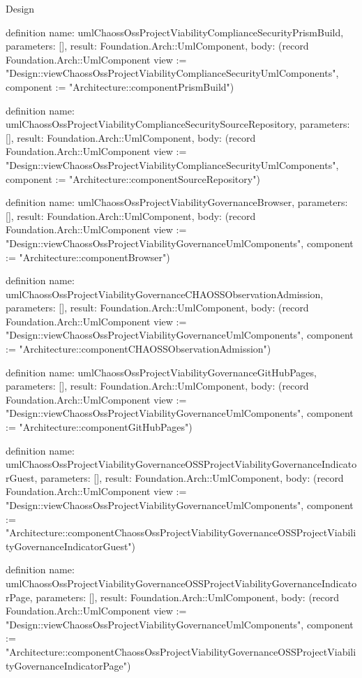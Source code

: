 \begin{lexlean}{Design}
\begin{semanticmodule}
definition{
  name: umlChaossOssProjectViabilityComplianceSecurityPrismBuild,
  parameters: [],
  result: Foundation.Arch::UmlComponent,
  body: (record Foundation.Arch::UmlComponent {view := "Design::viewChaossOssProjectViabilityComplianceSecurityUmlComponents", component := "Architecture::componentPrismBuild"})
}

definition{
  name: umlChaossOssProjectViabilityComplianceSecuritySourceRepository,
  parameters: [],
  result: Foundation.Arch::UmlComponent,
  body: (record Foundation.Arch::UmlComponent {view := "Design::viewChaossOssProjectViabilityComplianceSecurityUmlComponents", component := "Architecture::componentSourceRepository"})
}

definition{
  name: umlChaossOssProjectViabilityGovernanceBrowser,
  parameters: [],
  result: Foundation.Arch::UmlComponent,
  body: (record Foundation.Arch::UmlComponent {view := "Design::viewChaossOssProjectViabilityGovernanceUmlComponents", component := "Architecture::componentBrowser"})
}

definition{
  name: umlChaossOssProjectViabilityGovernanceCHAOSSObservationAdmission,
  parameters: [],
  result: Foundation.Arch::UmlComponent,
  body: (record Foundation.Arch::UmlComponent {view := "Design::viewChaossOssProjectViabilityGovernanceUmlComponents", component := "Architecture::componentCHAOSSObservationAdmission"})
}

definition{
  name: umlChaossOssProjectViabilityGovernanceGitHubPages,
  parameters: [],
  result: Foundation.Arch::UmlComponent,
  body: (record Foundation.Arch::UmlComponent {view := "Design::viewChaossOssProjectViabilityGovernanceUmlComponents", component := "Architecture::componentGitHubPages"})
}

definition{
  name: umlChaossOssProjectViabilityGovernanceOSSProjectViabilityGovernanceIndicatorGuest,
  parameters: [],
  result: Foundation.Arch::UmlComponent,
  body: (record Foundation.Arch::UmlComponent {view := "Design::viewChaossOssProjectViabilityGovernanceUmlComponents", component := "Architecture::componentChaossOssProjectViabilityGovernanceOSSProjectViabilityGovernanceIndicatorGuest"})
}

definition{
  name: umlChaossOssProjectViabilityGovernanceOSSProjectViabilityGovernanceIndicatorPage,
  parameters: [],
  result: Foundation.Arch::UmlComponent,
  body: (record Foundation.Arch::UmlComponent {view := "Design::viewChaossOssProjectViabilityGovernanceUmlComponents", component := "Architecture::componentChaossOssProjectViabilityGovernanceOSSProjectViabilityGovernanceIndicatorPage"})
}


\end{semanticmodule}
\end{lexlean}
